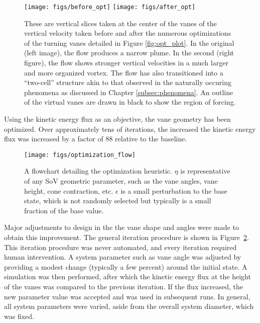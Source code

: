 \begin{figure}[htb]
  \centering
 \texttt{[image: figs/before\_opt]}
 \hfill
 \texttt{[image: figs/after\_opt]} \\
  \caption{These are vertical slices taken at the center of the vanes of
 the vertical velocity taken before and after the numerous optimizations
 of the turning vanes detailed in Figure \ref{fig:opt_plot}. In the
 original (left image), the flow produces a narrow plume. In the second
 (right figure), the flow shows stronger vertical velocities in a much
 larger and more organized vortex. The flow has also transitioned into a
 ``two-cell'' structure akin to that observed in the naturally occuring
 phenomena as discussed in Chapter \ref{subsec:phenomena}. An outline of
 the virtual vanes are drawn in black to show the region of forcing.}
  \label{fig:opt_flow}
\end{figure}

Using the kinetic energy flux as an objective, the vane geometry has
been optimized. Over approximately tens of iterations, the increased the
kinetic energy flux was increased by a factor of 88 relative to the 
baseline. 

\begin{figure}[htb]
 \centering
 \texttt{[image: figs/optimization\_flow]}
 \caption{A flowchart detailing the optimization heuristic. $\eta$ is
 representative of any SoV geometric parameter, such as the vane angles,
 vane height, cone contraction, etc. $\epsilon$ is a small perturbation
 to the base state, which is not randomly selected but typically is a
 small fraction of the base value. }
 \label{fig:opt_image}
\end{figure}


Major adjustments to design in the the vane shape and angles were made
to obtain this improvement. The general iteration procedure is shown in
Figure~\ref{fig:opt_image}. This iteration procedure was never
automated, and every iteration required human intervention. A system 
parameter such as vane angle was adjusted by providing a modest change
(typically a few percent) around the initial state. A simulation was
then performed, after which the kinetic energy flux at the height of the
vanes was compared to the previous iteration. If the flux increased,
the new parameter value was accepted and was used in subsequent runs. In
general, all system parameters were varied, aside from the overall
system diameter, which was fixed. 

